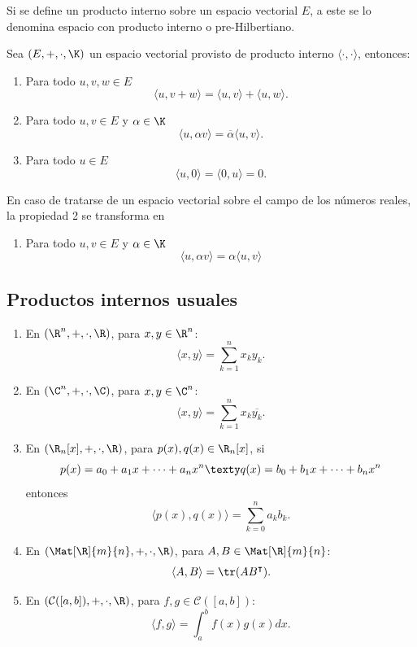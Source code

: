 \documentclass[a4,11pt]{aleph-notas}
\begin{document}
Si se define un producto interno sobre un espacio vectorial $E$, a este se lo denomina espacio con producto interno o pre-Hilbertiano. 

\begin{teo}
    Sea $(E,+,\cdot,\K)$ un espacio vectorial provisto de producto interno $\langle \cdot, \cdot \rangle$, entonces:
    \begin{enumerate}
        \item 
            Para todo $u,v,w \in E$ 
            \[\langle u, v+w\rangle = \langle u,v\rangle + \langle u, w \rangle.\]
        \item 
            Para todo $u,v \in E$ y $\alpha \in \K$
            \[\langle u, \alpha v\rangle =  \overline{\alpha}\langle u,v\rangle.\]
        \item
            Para todo $u\in E$ 
            \[\langle u, 0 \rangle =  \langle 0, u \rangle  = 0.\]
    \end{enumerate}
\end{teo}

\begin{advertencia}
    En caso de tratarse de un espacio vectorial sobre el campo de los números reales, la propiedad 2 se transforma en
    \begin{enumerate}[start=2]
        \item
            Para todo $u,v \in E$ y $\alpha \in \K$
            \[\langle u, \alpha v\rangle =  \alpha\langle u,v\rangle\]
    \end{enumerate}
\end{advertencia}

\subsection{Productos internos usuales}

\begin{enumerate}
    \item En $(\R^n,+, \cdot, \R)$, para $x,y\in \R^n$:
    \[
        \langle x, y \rangle = \sum_{k=1}^n x_k y_k.
    \]
    
    \item En $(\C^n,+, \cdot, \C)$, para $x,y\in \C^n$:
    \[
        \langle x, y \rangle = \sum_{k=1}^n x_k \overline{y_k}.
    \]
    
    \item En $(\R_n[x],+, \cdot, \R)$, para $p(x),q(x)\in \R_n[x]$, si 
    \[  
        p(x) = a_0 + a_1x + \cdots + a_nx^n
        \texty
        q(x) = b_0 + b_1x + \cdots + b_nx^n
    \]
    entonces
    \[
        \langle p(x), q(x) \rangle = \sum_{k=0}^n a_k b_k.
    \]
    
    \item En $(\Mat[\R]{m}{n},+, \cdot, \R)$, para $A,B\in \Mat[\R]{m}{n}$:
    \[
        \langle A, B \rangle = \tr(AB^\intercal).
    \]
    
    \item En $(\mathcal{C}([a,b]),+, \cdot, \R)$, para $f,g\in \mathcal{C}([a,b])$:
    \[
        \langle f, g \rangle = \int_a^b f(x) g(x) dx.
    \]
    \end{enumerate}
\end{document}
